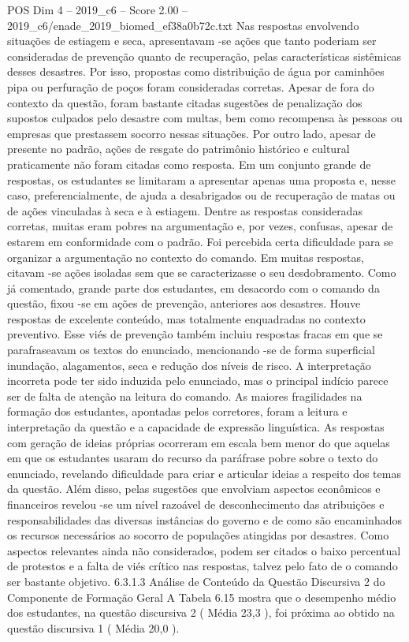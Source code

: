 \begin{textsample}{POS Dim 4 – 2019\_c6 – Score 2.00 – 2019\_c6/enade\_2019\_biomed\_ef38a0b72c.txt}
Nas respostas envolvendo situações de estiagem e seca, apresentavam -se ações que tanto poderiam ser consideradas de prevenção quanto de recuperação, pelas características sistêmicas desses desastres.
Por isso, propostas como distribuição de água por caminhões pipa ou perfuração de poços foram consideradas corretas.
Apesar de fora do contexto da questão, foram bastante citadas sugestões de penalização dos supostos culpados pelo desastre com multas, bem como recompensa às pessoas ou empresas que prestassem socorro nessas situações.
Por outro lado, apesar de presente no padrão, ações de resgate do patrimônio histórico e cultural praticamente não foram citadas como resposta.
Em um conjunto grande de respostas, os estudantes se limitaram a apresentar apenas uma proposta e, nesse caso, preferencialmente, de ajuda a desabrigados ou de recuperação de matas ou de ações vinculadas à seca e à estiagem.
Dentre as respostas consideradas corretas, muitas eram pobres na argumentação e, por vezes, confusas, apesar de estarem em conformidade com o padrão.
Foi percebida certa dificuldade para se organizar a argumentação no contexto do comando.
Em muitas respostas, citavam -se ações isoladas sem que se caracterizasse o seu desdobramento.
Como já comentado, grande parte dos estudantes, em desacordo com o comando da questão, fixou -se em ações de prevenção, anteriores aos desastres.
Houve respostas de excelente conteúdo, mas totalmente enquadradas no contexto preventivo.
Esse viés de prevenção também incluiu respostas fracas em que se parafraseavam os textos do enunciado, mencionando -se de forma superficial inundação, alagamentos, seca e redução dos níveis de risco.
A interpretação incorreta pode ter sido induzida pelo enunciado, mas o principal indício parece ser de falta de atenção na leitura do comando.
As maiores fragilidades na formação dos estudantes, apontadas pelos corretores, foram a leitura e interpretação da questão e a capacidade de expressão linguística.
As respostas com geração de ideias próprias ocorreram em escala bem menor do que aquelas em que os estudantes usaram do recurso da paráfrase pobre sobre o texto do enunciado, revelando dificuldade para criar e articular ideias a respeito dos temas da questão.
Além disso, pelas sugestões que envolviam aspectos econômicos e financeiros revelou -se um nível razoável de desconhecimento das atribuições e responsabilidades das diversas instâncias do governo e de como são encaminhados os recursos necessários ao socorro de populações atingidas por desastres.
Como aspectos relevantes ainda não considerados, podem ser citados o baixo percentual de protestos e a falta de viés crítico nas respostas, talvez pelo fato de o comando ser bastante objetivo. 6.3.1.3 Análise de Conteúdo da Questão Discursiva 2 do Componente de Formação Geral A Tabela 6.15 mostra que o desempenho médio dos estudantes, na questão discursiva 2 ( Média 23,3 ), foi próxima ao obtido na questão discursiva 1 ( Média 20,0 ).

\end{textsample}

